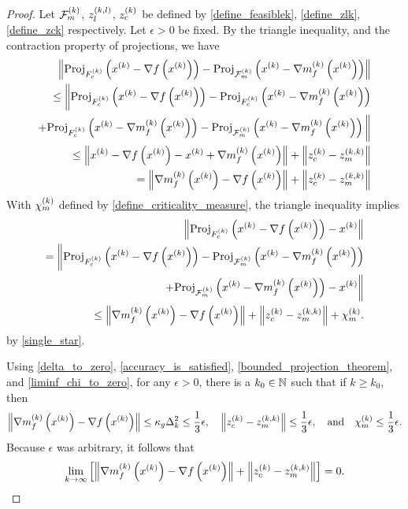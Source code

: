 \begin{proof}
Let 
${\mathcal F_m^{(k)}}$, ${z_l^{(k, l)}}$, ${z_c^{(k)}}$
be defined by 
\cref{define_feasiblek}, \cref{define_zlk}, \cref{define_zck}
respectively.
Let $\epsilon > 0$ be fixed.
By the triangle inequality, and the contraction property of projections, we have
\begin{align}\left \|
 {\textrm{Proj}}_{{F_c^{(k)}}}\left(x^{(k)} - \nabla f\left(x^{(k)}\right)\right)
-{\textrm{Proj}}_{{\mathcal F_m^{(k)}}}\left(x^{(k)} - {\nabla m_f^{(k)}\left(x^{(k)}\right)} \right)
\right\| \nonumber \\
\le 
\bigg \|
 {\textrm{Proj}}_{{F_c^{(k)}}}\left(x^{(k)} - \nabla f\left(x^{(k)}\right)\right) 
-{\textrm{Proj}}_{{F_c^{(k)}}}\left(x^{(k)} - {\nabla m_f^{(k)}\left(x^{(k)}\right)} \right) \nonumber \\
+{\textrm{Proj}}_{{F_c^{(k)}}}\left(x^{(k)} - {\nabla m_f^{(k)}\left(x^{(k)}\right)} \right)
-{\textrm{Proj}}_{{\mathcal F_m^{(k)}}}\left(x^{(k)} - {\nabla m_f^{(k)}\left(x^{(k)}\right)} \right)
\bigg\| \nonumber \\
\le \left\|
x^{(k)} - \nabla f\left(x^{(k)}\right) - x^{(k)} + {\nabla m_f^{(k)}\left(x^{(k)}\right)}
\right\| + \left\|{z_c^{(k)}} - {z_m^{(k, k)}}\right\| \nonumber \\
= \left\|{\nabla m_f^{(k)}\left(x^{(k)}\right)} - \nabla f\left(x^{(k)}\right)\right\| + \left\|{z_c^{(k)}} - {z_m^{(k, k)}}\right\| \label{single_star}
\end{align}
With ${\chi_m^{(k)}}$ defined by \cref{define_criticality_measure}, the triangle inequality implies
\begin{align*}
\left\|{\textrm{Proj}}_{{F_c^{(k)}}}\left(x^{(k)} - \nabla f\left(x^{(k)}\right)\right) - x^{(k)} \right\| \\
= \bigg\|
 {\textrm{Proj}}_{{F_c^{(k)}}}\left(x^{(k)} - \nabla f\left(x^{(k)}\right)\right)
-{\textrm{Proj}}_{{\mathcal F_m^{(k)}}}\left(x^{(k)} - {\nabla m_f^{(k)}\left(x^{(k)}\right)} \right) \\
+{\textrm{Proj}}_{{\mathcal F_m^{(k)}}}\left(x^{(k)} - {\nabla m_f^{(k)}\left(x^{(k)}\right)} \right)
- x^{(k)}\bigg\| \\
\le \left\|{\nabla m_f^{(k)}\left(x^{(k)}\right)} - \nabla f\left(x^{(k)}\right)\right\| + \left\|{z_c^{(k)}} - {z_m^{(k, k)}}\right\| + {\chi_m^{(k)}}.
\end{align*}
by \cref{single_star}.


Using \cref{delta_to_zero}, \cref{accuracy_is_satisfied}, \cref{bounded_projection_theorem}, and \cref{liminf_chi_to_zero},
for any $\epsilon > 0$, there is a $k_0 \in \mathbb N$ such that if $k \ge k_0$, then
\begin{align*}
\left\|{\nabla m_f^{(k)}\left(x^{(k)}\right)} - \nabla f\left(x^{(k)}\right)\right\| \le \kappa_g \Delta_k^2 \le \frac 1 3 \epsilon,
\quad
\left\|{z_c^{(k)}} - {z_m^{(k, k)}}\right\| \le \frac 1 3 \epsilon,
\quad \textrm{and} \quad
{\chi_m^{(k)}} \le \frac 1 3 \epsilon.
\end{align*}
Because $\epsilon$ was arbitrary, it follows that
\begin{align*}
\lim_{k\to\infty} \left[\left\|{\nabla m_f^{(k)}\left(x^{(k)}\right)} - \nabla f\left(x^{(k)}\right)\right\| + \left\|{z_c^{(k)}} - {z_m^{(k, k)}}\right\|\right] = 0.
\end{align*}
\end{proof}

